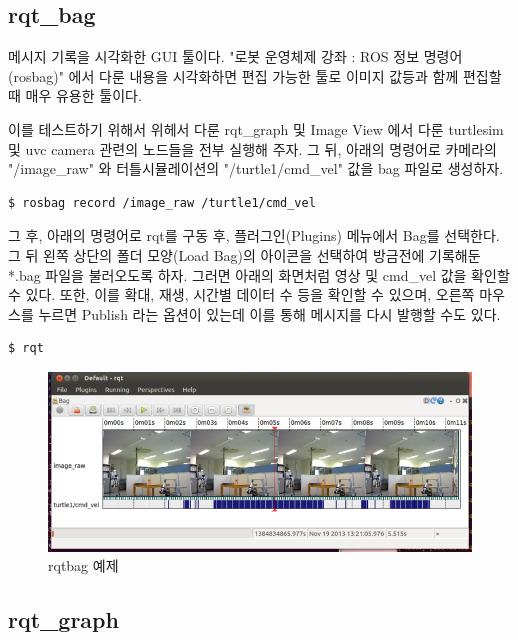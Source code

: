 \subsection{rqt\_bag}

메시지 기록을 시각화한 GUI 툴이다. "로봇 운영체제 강좌 : ROS 정보 명령어 (rosbag)" 에서 다룬 내용을 시각화하면 편집 가능한 툴로 이미지 값등과 함께 편집할 때 매우 유용한 툴이다.

이를 테스트하기 위해서 위헤서 다룬 rqt\_graph 및 Image View 에서 다룬 turtlesim 및 uvc camera 관련의 노드들을 전부 실행해 주자. 그 뒤, 아래의 명령어로 카메라의 "/image\_raw" 와 터틀시뮬레이션의 "/turtle1/cmd\_vel" 값을 bag 파일로 생성하자.

\begin{lstlisting}[language=ros]
$ rosbag record /image_raw /turtle1/cmd_vel
\end{lstlisting}

그 후, 아래의 명령어로 rqt를 구동 후, 플러그인(Plugins) 메뉴에서 Bag를 선택한다. 그 뒤 왼쪽 상단의 폴더 모양(Load Bag)의 아이콘을 선택하여 방금전에 기록해둔 *.bag 파일을 불러오도록 하자. 그러면 아래의 화면처럼 영상 및 cmd\_vel 값을 확인할 수 있다. 또한, 이를 확대, 재생, 시간별 데이터 수 등을 확인할 수 있으며, 오른쪽 마우스를 누르면 Publish 라는 옵션이 있는데 이를 통해 메시지를 다시 발행할 수도 있다.

\begin{lstlisting}[language=ros]
$ rqt
\end{lstlisting}

\begin{figure}[h]
\centering\includegraphics[width=0.9\columnwidth]{pictures/chapter6/rqt_bag.png}
\caption{rqtbag 예제}
\end{figure}

\subsection{rqt\_graph}

